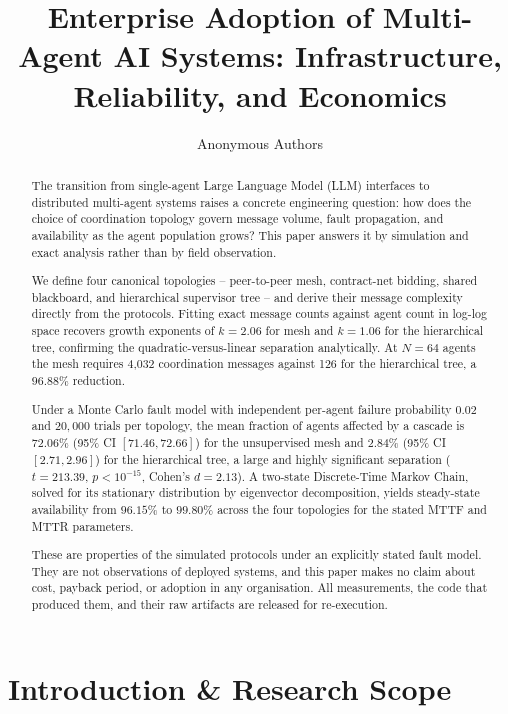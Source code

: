 \documentclass{article}
\begin{document}
\title{Enterprise Adoption of Multi-Agent AI Systems: Infrastructure, Reliability, and Economics}
\author{Anonymous Authors}
\maketitle

\begin{abstract}
The transition from single-agent Large Language Model (LLM) interfaces to distributed multi-agent systems raises a concrete engineering question: how does the choice of coordination topology govern message volume, fault propagation, and availability as the agent population grows? This paper answers it by simulation and exact analysis rather than by field observation.

We define four canonical topologies -- peer-to-peer mesh, contract-net bidding, shared blackboard, and hierarchical supervisor tree -- and derive their message complexity directly from the protocols. Fitting exact message counts against agent count in log-log space recovers growth exponents of $k = 2.06$ for mesh and $k = 1.06$ for the hierarchical tree, confirming the quadratic-versus-linear separation analytically. At $N = 64$ agents the mesh requires 4{,}032 coordination messages against 126 for the hierarchical tree, a $96.88\%$ reduction.

Under a Monte Carlo fault model with independent per-agent failure probability $0.02$ and $20{,}000$ trials per topology, the mean fraction of agents affected by a cascade is $72.06\%$ (95\% CI $[71.46, 72.66]$) for the unsupervised mesh and $2.84\%$ (95\% CI $[2.71, 2.96]$) for the hierarchical tree, a large and highly significant separation ($t = 213.39$, $p < 10^{-15}$, Cohen's $d = 2.13$). A two-state Discrete-Time Markov Chain, solved for its stationary distribution by eigenvector decomposition, yields steady-state availability from $96.15\%$ to $99.80\%$ across the four topologies for the stated MTTF and MTTR parameters.

These are properties of the simulated protocols under an explicitly stated fault model. They are not observations of deployed systems, and this paper makes no claim about cost, payback period, or adoption in any organisation. All measurements, the code that produced them, and their raw artifacts are released for re-execution.
\end{abstract}






\section{Introduction \& Research Scope}
\end{document}
